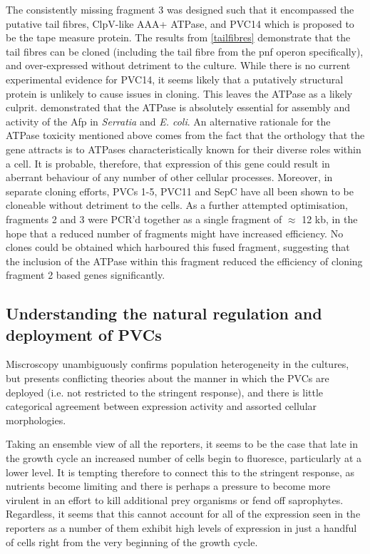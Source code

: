 The consistently missing fragment 3 was designed such that it encompassed the putative tail fibres, ClpV-like AAA+ ATPase, and PVC14 which is proposed to be the tape measure protein. The results from \vref{tailfibres} demonstrate that the tail fibres can be cloned (including the tail fibre from the pnf operon specifically), and over-expressed without detriment to the culture. While there is no current experimental evidence for PVC14, it seems likely that a putatively structural protein is unlikely to cause issues in cloning. This leaves the ATPase as a likely culprit. \cite{Rybakova2015} demonstrated that the ATPase is absolutely essential for assembly and activity of the Afp in \emph{Serratia} and \emph{E. coli}. An alternative rationale for the ATPase toxicity mentioned above comes from the fact that the orthology that the gene attracts is to ATPases characteristically known for their diverse roles within a cell. It is probable, therefore, that expression of this gene could result in aberrant behaviour of any number of other cellular processes. Moreover, in separate cloning efforts, PVCs 1-5, PVC11 and SepC have all been shown to be cloneable without detriment to the cells. As a further attempted optimisation, fragments 2 and 3 were PCR'd together as a single fragment of $\approx$ 12 kb, in the hope that a reduced number of fragments might have increased efficiency. No clones could be obtained which harboured this fused fragment, suggesting that the inclusion of the ATPase within this fragment reduced the efficiency of cloning fragment 2 based genes significantly.

\subsection{Understanding the natural regulation and deployment of PVCs}

Miscroscopy unambiguously confirms population heterogeneity in the cultures, but presents conflicting theories about the manner in which the PVCs are deployed (i.e. not restricted to the stringent response), and there is little categorical agreement between expression activity and assorted cellular morphologies.

Taking an ensemble view of all the reporters, it seems to be the case that late in the growth cycle an increased number of cells begin to fluoresce, particularly at a lower level. It is tempting therefore to connect this to the stringent response, as nutrients become limiting and there is perhaps a pressure to become more virulent in an effort to kill additional prey organisms or fend off saprophytes. Regardless, it seems that this cannot account for all of the expression seen in the reporters as a number of them exhibit high levels of expression in just a handful of cells right from the very beginning of the growth cycle.

